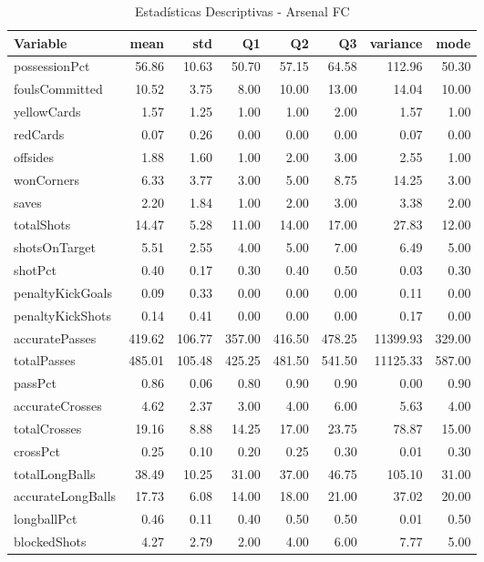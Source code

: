 \begin{table}[H]
\centering
\caption{Estadísticas Descriptivas - Arsenal FC}
\label{tab:eng_arsenal}
\small
\begin{tabular}{lrrrrrrr}
\hline
Variable & mean & std & Q1 & Q2 & Q3 & variance & mode \\
\hline
possessionPct & 56.86 & 10.63 & 50.70 & 57.15 & 64.58 & 112.96 & 50.30 \\
foulsCommitted & 10.52 & 3.75 & 8.00 & 10.00 & 13.00 & 14.04 & 10.00 \\
yellowCards & 1.57 & 1.25 & 1.00 & 1.00 & 2.00 & 1.57 & 1.00 \\
redCards & 0.07 & 0.26 & 0.00 & 0.00 & 0.00 & 0.07 & 0.00 \\
offsides & 1.88 & 1.60 & 1.00 & 2.00 & 3.00 & 2.55 & 1.00 \\
wonCorners & 6.33 & 3.77 & 3.00 & 5.00 & 8.75 & 14.25 & 3.00 \\
saves & 2.20 & 1.84 & 1.00 & 2.00 & 3.00 & 3.38 & 2.00 \\
totalShots & 14.47 & 5.28 & 11.00 & 14.00 & 17.00 & 27.83 & 12.00 \\
shotsOnTarget & 5.51 & 2.55 & 4.00 & 5.00 & 7.00 & 6.49 & 5.00 \\
shotPct & 0.40 & 0.17 & 0.30 & 0.40 & 0.50 & 0.03 & 0.30 \\
penaltyKickGoals & 0.09 & 0.33 & 0.00 & 0.00 & 0.00 & 0.11 & 0.00 \\
penaltyKickShots & 0.14 & 0.41 & 0.00 & 0.00 & 0.00 & 0.17 & 0.00 \\
accuratePasses & 419.62 & 106.77 & 357.00 & 416.50 & 478.25 & 11399.93 & 329.00 \\
totalPasses & 485.01 & 105.48 & 425.25 & 481.50 & 541.50 & 11125.33 & 587.00 \\
passPct & 0.86 & 0.06 & 0.80 & 0.90 & 0.90 & 0.00 & 0.90 \\
accurateCrosses & 4.62 & 2.37 & 3.00 & 4.00 & 6.00 & 5.63 & 4.00 \\
totalCrosses & 19.16 & 8.88 & 14.25 & 17.00 & 23.75 & 78.87 & 15.00 \\
crossPct & 0.25 & 0.10 & 0.20 & 0.25 & 0.30 & 0.01 & 0.30 \\
totalLongBalls & 38.49 & 10.25 & 31.00 & 37.00 & 46.75 & 105.10 & 31.00 \\
accurateLongBalls & 17.73 & 6.08 & 14.00 & 18.00 & 21.00 & 37.02 & 20.00 \\
longballPct & 0.46 & 0.11 & 0.40 & 0.50 & 0.50 & 0.01 & 0.50 \\
blockedShots & 4.27 & 2.79 & 2.00 & 4.00 & 6.00 & 7.77 & 5.00 \\

\end{tabular}
\end{table}
